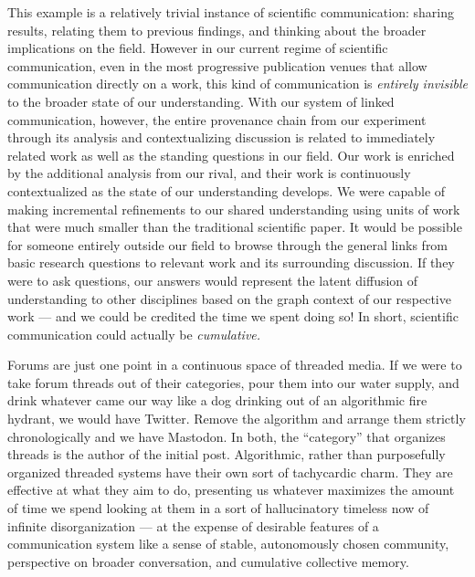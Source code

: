 This example is a relatively trivial instance of scientific
communication: sharing results, relating them to previous findings, and
thinking about the broader implications on the field. However in our
current regime of scientific communication, even in the most progressive
publication venues that allow communication directly on a work, this
kind of communication is \emph{entirely invisible} to the broader state
of our understanding. With our system of linked communication, however,
the entire provenance chain from our experiment through its analysis and
contextualizing discussion is related to immediately related work as
well as the standing questions in our field. Our work is enriched by the
additional analysis from our rival, and their work is continuously
contextualized as the state of our understanding develops. We were
capable of making incremental refinements to our shared understanding
using units of work that were much smaller than the traditional
scientific paper. It would be possible for someone entirely outside our
field to browse through the general links from basic research questions
to relevant work and its surrounding discussion. If they were to ask
questions, our answers would represent the latent diffusion of
understanding to other disciplines based on the graph context of our
respective work --- and we could be credited the time we spent doing so!
In short, scientific communication could actually be \emph{cumulative.}

Forums are just one point in a continuous space of threaded media. If we
were to take forum threads out of their categories, pour them into our
water supply, and drink whatever came our way like a dog drinking out of
an algorithmic fire hydrant, we would have Twitter. Remove the algorithm
and arrange them strictly chronologically and we have Mastodon. In both,
the ``category'' that organizes threads is the author of the initial
post. Algorithmic, rather than purposefully organized threaded systems
have their own sort of tachycardic charm. They are effective at what
they aim to do, presenting us whatever maximizes the amount of time we
spend looking at them in a sort of hallucinatory timeless now of
infinite disorganization --- at the expense of desirable features of a
communication system like a sense of stable, autonomously chosen
community, perspective on broader conversation, and cumulative
collective memory.

